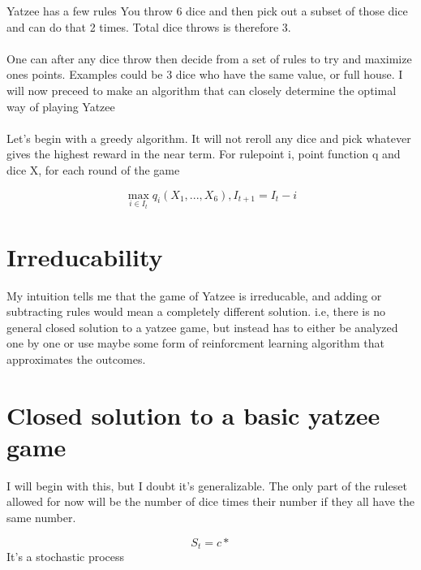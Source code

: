 \documentclass[a4paper,12pt]{article}
\begin{document}
Yatzee has a few rules
You throw 6 dice and then pick out a subset of those dice and can do that
2 times. Total dice throws is therefore 3.

\paragraph{}
One can after any dice throw then decide from a set of rules to try and maximize
ones points. Examples could be 3 dice who have the same value, or full house. I will
now preceed to make an algorithm that can closely determine the optimal way of playing
Yatzee

\paragraph{}
Let's begin with a greedy algorithm. It will not reroll any dice and pick whatever gives
the highest reward in the near term. For rulepoint i, point function q and dice X,
for each round of the game

$$\max_{i\in I_t} q_i({X_1,...,X_6}), I_{t+1} = I_t - i$$




\section{Irreducability}

My intuition tells me that the game of Yatzee is irreducable, and adding
or subtracting rules would mean a completely different solution. i.e, there is
no general closed solution to a yatzee game, but instead has to either be analyzed
one by one or use maybe some form of reinforcment learning algorithm that
approximates the outcomes.

\section{Closed solution to a basic yatzee game}

I will begin with this, but I doubt it's generalizable. The only part
of the ruleset allowed for now will be the number of dice times their number
if they all have the same number.

$$S_t = c*$$
It's a stochastic process
\end{document}

